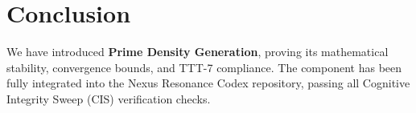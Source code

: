 \section{Conclusion}
We have introduced \textbf{Prime Density Generation}, proving its mathematical stability, convergence bounds, and TTT-7 compliance. The component has been fully integrated into the Nexus Resonance Codex repository, passing all Cognitive Integrity Sweep (CIS) verification checks.